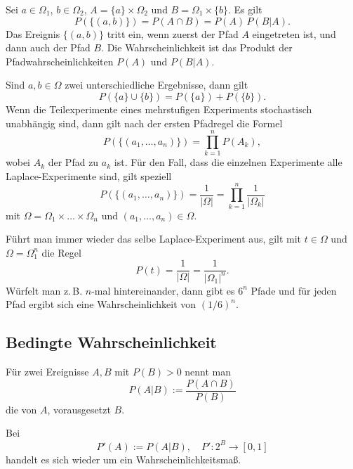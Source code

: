 Sei $a\in\Omega_1$, $b\in\Omega_2$, $A=\{a\}\times\Omega_2$
und $B=\Omega_1\times\{b\}$. Es gilt
\begin{equation}
P(\{(a,b)\}) = P(A\cap B) = P(A)\,P(B|A).
\end{equation}
Das Ereignis $\{(a,b)\}$ tritt ein, wenn zuerst
der Pfad $A$ eingetreten ist, und dann auch der Pfad $B$.
Die Wahrscheinlichkeit ist das Produkt der Pfadwahrscheinlichkeiten
$P(A)$ und $P(B|A)$.

Sind $a,b\in\Omega$ zwei unterschiedliche
Ergebnisse, dann gilt
\begin{equation}
P(\{a\}\cup\{b\}) = P(\{a\})+P(\{b\}).
\end{equation}
Wenn die Teilexperimente eines mehrstufigen Experiments
stochastisch unabhängig sind, dann gilt nach der ersten Pfadregel
die Formel
\begin{equation}
P(\{(a_1,\ldots,a_n)\}) = \prod_{k=1}^n P(A_k),
\end{equation}
wobei $A_k$ der Pfad zu $a_k$ ist.
Für den Fall, dass die einzelnen
Experimente alle Laplace-Experimente sind, gilt speziell
\begin{equation}
P(\{(a_1,\ldots,a_n)\}) = \frac{1}{|\Omega|} = \prod_{k=1}^n \frac{1}{|\Omega_k|}
\end{equation}
mit $\Omega=\Omega_1\times\ldots\times\Omega_n$ und $(a_1,\ldots,a_n)\in\Omega$.

Führt man immer wieder das selbe Laplace-Experiment aus, gilt
mit $t\in\Omega$ und $\Omega=\Omega_1^n$ die Regel
\begin{equation}
P(t) = \frac{1}{|\Omega|} = \frac{1}{|\Omega_1|^n}.
\end{equation}
Würfelt man z.\,B. $n$-mal hintereinander, dann gibt es $6^n$ Pfade
und für jeden Pfad ergibt sich eine Wahrscheinlichkeit von $(1/6)^n$.

\subsection{Bedingte Wahrscheinlichkeit}
\begin{definition}\mbox{}\newline%
Für zwei Ereignisse $A,B$ mit $P(B)>0$ nennt man
\begin{equation}
P(A|B) := \frac{P(A\cap B)}{P(B)}
\end{equation}
die  von $A$, vorausgesetzt $B$.
\end{definition}
Bei
\begin{equation}
P'(A) := P(A|B),\quad P'\colon 2^B\to [0,1]
\end{equation}
handelt es sich wieder um ein Wahrscheinlichkeitsmaß.

